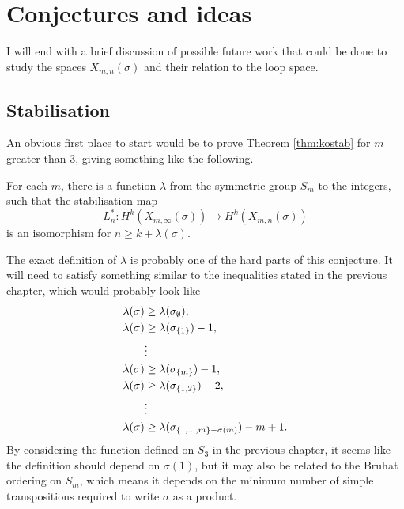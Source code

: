 

\chapter{Conjectures and ideas}
\label{chap:fremtid}

I will end with a brief discussion of possible future work that could
be done to study the spaces $X_{m,n}(\sigma)$ and their relation to
the loop space.

\section{Stabilisation}

An obvious first place to start would be to prove Theorem
\ref{thm:kostab} for $m$ greater than $3$, giving something like the
following.

\begin{conjecture}
  For each $m$, there is a function $\lambda$ from the symmetric
  group $S_m$ to the integers, such that the stabilisation map
  \[ L_n^* : H^k(X_{m,\infty}(\sigma)) \to H^k(X_{m,n}(\sigma)) \]
  is an isomorphism for $n \geq k + \lambda(\sigma)$.
\end{conjecture}

The exact definition of $\lambda$ is probably one of the hard parts of
this conjecture. It will need to satisfy something similar to the
inequalities stated in the previous chapter, which would probably look
like
\begin{align*}
  \lambda(\sigma) &\geq \lambda(\sigma_{\emptyset}), \\
  \lambda(\sigma) &\geq \lambda(\sigma_{\left\{ 1 \right\}}) - 1,\\
  &\vdots \\
  \lambda(\sigma) &\geq \lambda(\sigma_{\left\{ m \right\}}) - 1,\\
  \lambda(\sigma) &\geq \lambda(\sigma_{\left\{ 1,2 \right\}}) - 2,\\
  &\vdots \\
  \lambda(\sigma) &\geq \lambda(\sigma_{\left\{ 1,\dots,m \right\}-\sigma(m)}) - m + 1.
\end{align*}
By considering the function defined on $S_3$ in the previous chapter,
it seems like the definition should depend on $\sigma(1)$, but it may
also be related to the Bruhat ordering on $S_m$, which means it
depends on the minimum number of simple transpositions required to
write $\sigma$ as a product.

